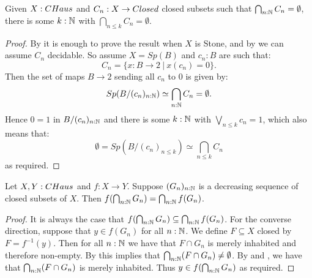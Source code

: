 \begin{lemma}\label{CHausFiniteIntersectionProperty}
  Given $X:\Chaus$ and $C_n:X\to \Closed$ closed subsets such that $\bigcap_{n:\mathbb{N}} C_n =\emptyset$, there is some $k:\mathbb{N}$ 
  with $\bigcap_{n\leq k} C_n  = \emptyset$. 
\end{lemma}
\begin{proof}
  By  it is enough to prove the result when $X$ is Stone, and by  we can assume $C_n$ decidable.
  So assume 
  $X=Sp(B)$ and $c_n:B$ are such that: 
  $$C_n = \{x:B\to 2\ |\ x(c_n) = 0\}.$$ 
  Then the set of maps $B\to 2$ sending all $c_n$ to $0$ is given by: 
  $$Sp(B/(c_n)_{n:\N})%
  \simeq \bigcap_{n:\N} C_n = \emptyset .$$
  Hence 
  $0=1$ in $B/(c_n)_{n:\mathbb{N}}$ %
  and there is some $k:\mathbb{N}$ with 
  $\bigvee_{n\leq k} c_n = 1$, which also means that: 
  $$\emptyset = Sp(B/(c_n)_{n\leq k}) %
  \simeq \bigcap_{n\leq k} C_n $$
  as required.
\end{proof}

\begin{corollary}\label{ChausMapsPreserveIntersectionOfClosed}
  Let $X,Y:\CHaus$ and $f:X \to Y$. 
  Suppose $(G_n)_{n:\mathbb{N}}$ is a decreasing sequence of closed subsets of $X$. 
  Then $f(\bigcap_{n:\mathbb{N}} G_n) = \bigcap_{n:\mathbb{N}}f(G_n)$. 
\end{corollary}
\begin{proof}
  It is always the case that $f(\bigcap_{n:\mathbb{N}} G_n) \subseteq \bigcap_{n:\mathbb{N}} f(G_n)$. 
  For the converse direction, suppose that $y \in f(G_n)$ for all $n:\mathbb{N}$. 
  We define $F\subseteq X$ closed by $F=f^{-1}(y)$. 
  Then for all $n:\mathbb{N}$ we have that $F\cap G_n$ is merely inhabited and therefore non-empty. 
  By  this implies that $\bigcap_{n:\mathbb{N}}(F\cap G_n) \neq \emptyset$. 
  By  and , we have that $\bigcap_{n:\mathbb{N}} (F\cap G_n)$ is merely inhabited. Thus $y\in f(\bigcap_{n:\mathbb{N}} G_n)$ as required. 
\end{proof}

